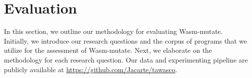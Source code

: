 \documentclass[sigplan,screen]{acmart}
\newcommand*\badge[1]{ \colorbox{red}{\color{white}#1}}
\newcommand{\tool}{Wasm-mutate\xspace}
\newcommand{\Wasm}{WebAssembly\xspace}
\newcommand{\dataurl}{\url{https://github.com/Jacarte/tawasco}}
\newcommand{\todo}[1]{%
\refstepcounter{todo}
\noindent\textbf{\badge{TODO}} {\color{red}#1}
\addcontentsline{td}{todo}
{\color{red}\thesection.\thetodo\xspace #1}}
\begin{document}
%




\vspace{-2mm}
\section {Evaluation}
\label{eval}

In this section, we outline our methodology for evaluating \tool.
Initially, we introduce our research questions and the corpus of programs that we utilize for the assessment of \tool.
Next, we elaborate on the methodology for each research question.
Our data and experimenting pipeline are publicly available at \dataurl.


\newcommand\rqstatic{To what extent are the program variants generated by \tool statically different from the original programs?\xspace}

\newcommand\rqdynamic{To what extent are the program variants generated by \tool dynamically different from the original programs?\xspace}

\newcommand\rqdefensive{To what extent does \tool prevent side-channel attacks on \Wasm programs?\xspace}


\newcommand\rqperformance{To what extent does \tool affects the performance of \Wasm program variants?\xspace}


\newcommand\rqtesting{To what extent can \tool be used to perform differential testing of \Wasm tools?\xspace}

\newcommand{\nProgramsRosetta}{303\xspace}


\newcommand{\DTWStatic}{\ensuremath{\mathit{dt\_static}\xspace}}
\newcommand{\DTWDynamic}{\ensuremath{\mathit{dt\_dy}\xspace}}
\end{document}
